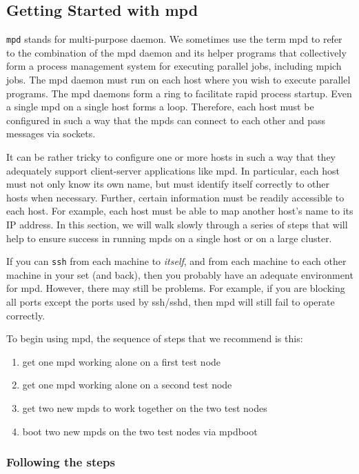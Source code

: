 \documentclass[dvipdfm,11pt]{article}
\begin{document}
\subsection{Getting Started with mpd}
\label{sec:getting-started}

\texttt{mpd} stands for multi-purpose daemon.  We sometimes use the term
mpd to refer to the combination of the mpd daemon and its helper programs
that collectively form a process management system for executing parallel
jobs, including mpich jobs.  The mpd daemon must run on each host where
you wish to execute parallel programs.  The mpd daemons form a ring to
facilitate rapid process startup.  Even a single mpd on a single host
forms a loop.  Therefore, each host must be configured in such a way
that the mpds can connect to each other and pass messages via sockets.

It can be rather tricky to configure one or more hosts in such a way
that they adequately support client-server applications like mpd.
In particular, each host must not only know its own name, but must
identify itself correctly to other hosts when necessary.  Further, certain
information must be readily accessible to each host.  For example, each
host must be able to map another host's name to its IP address.  In this
section, we will walk slowly through a series of steps that will help
to ensure success in running mpds on a single host or on a large cluster.

If you can \texttt{ssh} from each machine to \emph{itself}, and from
each machine to each other machine in your set (and back), then you
probably have an adequate environment for mpd.  However, there may
still be problems.  For example, if you are blocking all ports except
the ports used by ssh/sshd, then mpd will still fail to operate correctly.

To begin using mpd, the sequence of steps that we recommend is this:
\begin{enumerate}
    \item get one mpd working alone on a first test node
    \item get one mpd working alone on a second test node
    \item get two new mpds to work together on the two test nodes
    \item boot two new mpds on the two test nodes via mpdboot
\end{enumerate}

\subsubsection{Following the steps}
\end{document}
